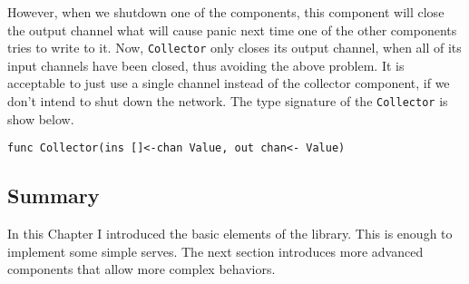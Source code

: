 However, when we shutdown
one of the components, this component will close the output channel
what will cause panic next time one of the other components tries to write
to it. Now, \texttt{Collector} only closes its output channel, when
all of its input channels have been closed, thus avoiding the above
problem. It is acceptable to just use a single channel instead of
the collector component, if we don't intend to shut down the network.
The type signature of the \texttt{Collector} is show below.
\begin{lstlisting}
func Collector(ins []<-chan Value, out chan<- Value)
\end{lstlisting}


\subsection{Summary}
In this Chapter I introduced the basic elements of the library. This 
is enough to implement some simple serves. The next section introduces
more advanced components that allow more complex behaviors.

